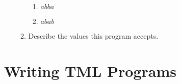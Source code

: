 \documentclass[answers]{exam}
\begin{document}
\begin{enumerate}
\begin{enumerate}
\begin{enumerate}
                \item $abba$
                \begin{solution}
                    
                \end{solution}

                \item $abab$
                \begin{solution}
                    
                \end{solution}
            \end{enumerate}

            \item Describe the values this program accepts.
            \begin{solution}
                \vspace*{25pt}
            \end{solution}
        \end{enumerate}
    \end{enumerate}
    \newpage

    
    \section{Writing TML Programs}
    
\end{document}
